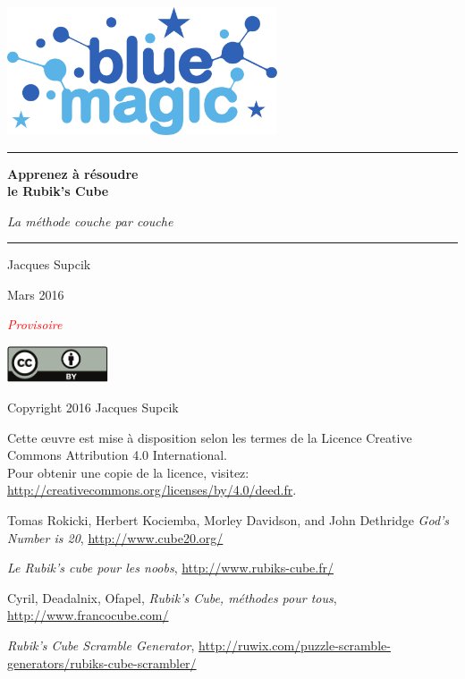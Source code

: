 \documentclass[10pt,paper=a5,pagesize]{scrbook}
\begin{document}
\frontmatter
\thispagestyle{empty}
\begin{titlepage}
\begin{center}
\includegraphics[width=8cm]{bluemagic_logo.pdf}
\vspace*{8mm}

\rule{\textwidth}{1pt}
{\Huge\textbf{Apprenez à résoudre\\
\smallskip
le Rubik's Cube}}
\medskip

{\LARGE\textit{La méthode \og couche par couche\fg}}
\rule{\textwidth}{1pt}
\vspace*{10mm}

{\Large Jacques Supcik}
\vspace*{10mm}

\enlargethispage{1cm}
{\Large Mars 2016}
\vfill

{\Huge\textit{\textcolor{red}{Provisoire}}}

\end{center}
\end{titlepage}

\thispagestyle{empty}
\par\vspace*{\fill}
\includegraphics[width=30mm]{by.pdf}

Copyright \textcopyright{} 2016 Jacques Supcik

Cette œuvre est mise à disposition selon les termes de la Licence Creative Commons Attribution 4.0 International.
\medskip\\
Pour obtenir une copie de la licence, visitez:\\
\url{http://creativecommons.org/licenses/by/4.0/deed.fr}.
\newpage

\tableofcontents
\mainmatter



% 
% 


\backmatter
\begin{thebibliography}{9}
	
	 Tomas Rokicki, Herbert Kociemba, Morley Davidson, and John Dethridge
	\emph{God's Number is 20},
	\url{http://www.cube20.org/}

	\emph{Le Rubik's cube pour les noobs},
	\url{http://www.rubiks-cube.fr/}

	Cyril, Deadalnix, Ofapel,
	\emph{Rubik's Cube, méthodes pour tous},
	\url{http://www.francocube.com/}
	
	\emph{Rubik’s Cube Scramble Generator},
	\url{http://ruwix.com/puzzle-scramble-generators/rubiks-cube-scrambler/}
	
	
\end{thebibliography}
\end{document}
